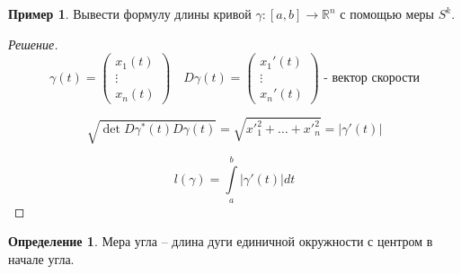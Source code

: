\documentclass[a5paper]{article}
\newcounter{through}
\theoremstyle{plain}
\theoremstyle{definition}
\newtheorem{definition}[through]{Определение}
\newtheorem{example}[through]{Пример}
\numberwithin{through}{section}
\numberwithin{equation}{section}
\begin{document}
\begin{example}
	Вывести формулу длины кривой $\gamma : [a, b] \to \mathbb{R}^n$ с помощью меры $S^k$.
\end{example}

\begin{proof}[Решение]
	\begin{equation*}
	\gamma(t) = 
	\begin{pmatrix}
	x_1(t) \\
	\vdots \\
	x_n(t)
	\end{pmatrix}
	\quad	
	D \gamma(t) = 
	\begin{pmatrix}
	x_1'(t) \\
	\vdots \\
	x_n'(t)
	\end{pmatrix} 
	\text{ - вектор скорости}
	\end{equation*}
	
	\begin{equation*}
	\sqrt{\det D \gamma^* (t) D \gamma (t)} = \sqrt{{x'}_1^2 + \ldots + {x'}_n^2} = |\gamma'(t)|
	\end{equation*}
	
	\begin{equation*}
	l(\gamma) = \int\limits_{a}^{b} |\gamma'(t)|dt
	\end{equation*}
\end{proof}


\begin{definition}
	Мера угла -- длина дуги единичной окружности с центром в начале угла.
\end{definition}
\end{document}

